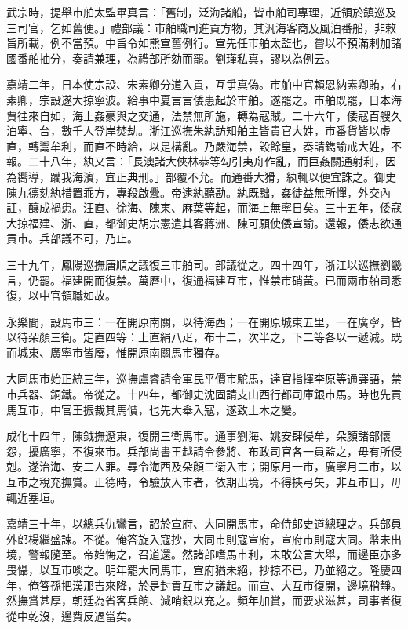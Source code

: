 武宗時，提舉市舶太監畢真言：「舊制，泛海諸船，皆市舶司專理，近領於鎮巡及三司官，乞如舊便。」禮部議：市舶職司進貢方物，其汎海客商及風泊番船，非敕旨所載，例不當預。中旨令如熊宣舊例行。宣先任市舶太監也，嘗以不預滿剌加諸國番舶抽分，奏請兼理，為禮部所劾而罷。劉瑾私真，謬以為例云。

嘉靖二年，日本使宗設、宋素卿分道入貢，互爭真偽。市舶中官賴恩納素卿賄，右素卿，宗設遂大掠寧波。給事中夏言言倭患起於市舶。遂罷之。市舶既罷，日本海賈往來自如，海上姦豪與之交通，法禁無所施，轉為寇賊。二十六年，倭寇百艘久泊寧、台，數千人登岸焚劫。浙江巡撫朱紈訪知舶主皆貴官大姓，市番貨皆以虛直，轉鬻牟利，而直不時給，以是構亂。乃嚴海禁，毀餘皇，奏請鐫諭戒大姓，不報。二十八年，紈又言：「長澳諸大俠林恭等勾引夷舟作亂，而巨姦關通射利，因為嚮導，躪我海濱，宜正典刑。」部覆不允。而通番大猾，紈輒以便宜誅之。御史陳九德劾紈措置乖方，專殺啟釁。帝逮紈聽勘。紈既黜，姦徒益無所憚，外交內訌，釀成禍患。汪直、徐海、陳東、麻葉等起，而海上無寧日矣。三十五年，倭寇大掠福建、浙、直，都御史胡宗憲遣其客蔣洲、陳可願使倭宣諭。還報，倭志欲通貢市。兵部議不可，乃止。

三十九年，鳳陽巡撫唐順之議復三市舶司。部議從之。四十四年，浙江以巡撫劉畿言，仍罷。福建開而復禁。萬曆中，復通福建互市，惟禁市硝黃。已而兩市舶司悉復，以中官領職如故。

永樂間，設馬市三：一在開原南關，以待海西；一在開原城東五里，一在廣寧，皆以待朵顏三衛。定直四等：上直絹八疋，布十二，次半之，下二等各以一遞減。既而城東、廣寧市皆廢，惟開原南關馬市獨存。

大同馬市始正統三年，巡撫盧睿請令軍民平價市駝馬，達官指揮李原等通譯語，禁市兵器、銅鐵。帝從之。十四年，都御史沈固請支山西行都司庫銀市馬。時也先貢馬互市，中官王振裁其馬價，也先大舉入寇，遂致土木之變。

成化十四年，陳鉞撫遼東，復開三衛馬市。通事劉海、姚安肆侵牟，朵顏諸部懷怨，擾廣寧，不復來市。兵部尚書王越請令參將、布政司官各一員監之，毋有所侵剋。遂治海、安二人罪。尋令海西及朵顏三衛入市；開原月一市，廣寧月二市，以互市之稅充撫賞。正德時，令驗放入市者，依期出境，不得挾弓矢，非互市日，毋輒近塞垣。

嘉靖三十年，以總兵仇鸞言，詔於宣府、大同開馬市，命侍郎史道總理之。兵部員外郎楊繼盛諫。不從。俺答旋入寇抄，大同市則寇宣府，宣府市則寇大同。幣未出境，警報隨至。帝始悔之，召道還。然諸部嗜馬市利，未敢公言大舉，而邊臣亦多畏懾，以互市啖之。明年罷大同馬市，宣府猶未絕，抄掠不已，乃並絕之。隆慶四年，俺答孫把漢那吉來降，於是封貢互市之議起。而宣、大互市復開，邊境稍靜。然撫賞甚厚，朝廷為省客兵餉、減哨銀以充之。頻年加賞，而要求滋甚，司事者復從中乾沒，邊費反過當矣。

